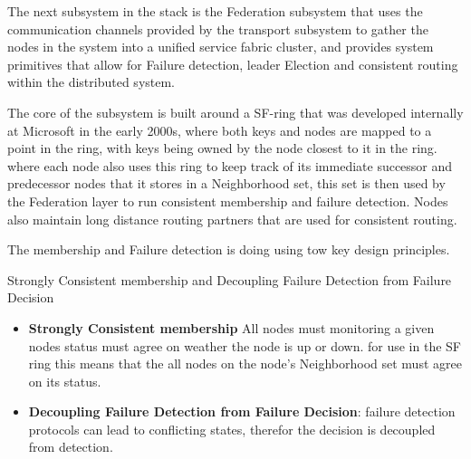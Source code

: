 \documentclass[a4paper,10pt,titlepage]{report}
\begin{document}
    The next subsystem in the stack is the Federation subsystem that uses the communication channels provided by the transport subsystem to gather the nodes in the system into a unified service fabric cluster, and provides system primitives that allow for Failure detection, leader Election and consistent routing within the distributed system.\\
    \vspace{5mm}

    The core of the subsystem is built around a SF-ring that was developed internally at Microsoft in the early 2000s, where both keys and nodes are mapped to a point in the ring, with keys being owned by the node closest to it in the ring. where each node also uses this ring to keep track of its immediate successor and predecessor nodes that it stores in a Neighborhood set, this set is then used by the Federation layer to run consistent membership and failure detection. Nodes also maintain long distance routing partners that are used for consistent routing.\\
    \vspace{5mm}

    The membership and Failure detection is doing using tow key design principles.\\
    \vspace{5mm}

    Strongly Consistent membership and Decoupling Failure Detection from Failure Decision\\
    \vspace{5mm}

    \begin{itemize}
        \item \textbf{Strongly Consistent membership} All nodes must monitoring a given nodes status must agree on weather the node is up or down. for use in the SF ring this means that the all nodes on the node's Neighborhood set must agree on its status.
        \item \textbf{Decoupling Failure Detection from Failure Decision}: failure detection protocols can lead to conflicting states, therefor the decision is decoupled from detection.
    \end{itemize}
    \vspace{5mm}
\end{document}
